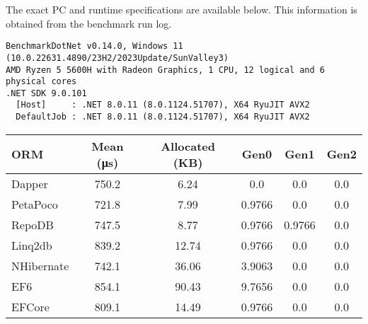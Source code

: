 The exact PC and runtime specifications are available below. This information is obtained from the benchmark run log. 
\begin{lstlisting}
BenchmarkDotNet v0.14.0, Windows 11 (10.0.22631.4890/23H2/2023Update/SunValley3)
AMD Ryzen 5 5600H with Radeon Graphics, 1 CPU, 12 logical and 6 physical cores
.NET SDK 9.0.101
  [Host]     : .NET 8.0.11 (8.0.1124.51707), X64 RyuJIT AVX2
  DefaultJob : .NET 8.0.11 (8.0.1124.51707), X64 RyuJIT AVX2
\end{lstlisting}

\begin{center}
    \begin{tabular}{l S S S S S}
        \hline
        ORM & {Mean (\si{\micro\second})} & {Allocated (KB)} & {Gen0} & {Gen1} & {Gen2} \\
        \hline
        Dapper    & 750.2  & 6.24  & 0.0    & 0.0    & 0.0    \\
        PetaPoco  & 721.8  & 7.99  & 0.9766 & 0.0    & 0.0    \\
        RepoDB    & 747.5  & 8.77  & 0.9766 & 0.9766 & 0.0    \\
        Linq2db   & 839.2  & 12.74 & 0.9766 & 0.0    & 0.0    \\
        NHibernate & 742.1 & 36.06 & 3.9063 & 0.0    & 0.0    \\
        EF6       & 854.1  & 90.43 & 9.7656 & 0.0    & 0.0    \\
        EFCore    & 809.1  & 14.49 & 0.9766 & 0.0    & 0.0    \\
        \hline
    \end{tabular}
\end{center}



